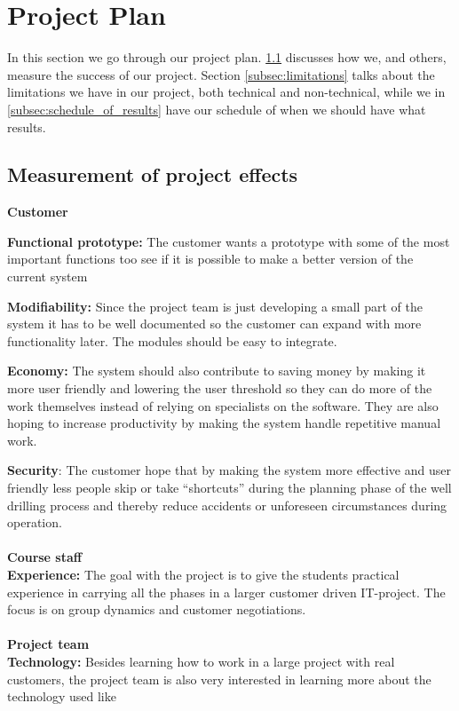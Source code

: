 \documentclass{report}
\begin{document}
\section{Project Plan} \label{sec:project_plan}
In this section we  go through our project plan. \ref{subsec:measurement_of_project_effects} discusses how we, and others, measure the success of our project. Section \ref{subsec:limitations} talks about the limitations we have in our project, both technical and non-technical, while we in \ref{subsec:schedule_of_results} have our schedule of when we should have what results.
\subsection{Measurement of project effects} \label{subsec:measurement_of_project_effects}
\textbf{Customer}

\textbf{Functional prototype:} The customer wants a prototype with some of the most important functions too see if it is possible to make a better version of the current system

\textbf{Modifiability:} Since the project team is just developing a small part of the system it has to be well documented so the customer can expand with more functionality later. The modules should be easy to integrate.

\textbf{Economy:} The system should also contribute to saving money by making it more user friendly and lowering the user threshold so they can do more of the work themselves instead of relying on specialists on the software. They are also hoping to increase productivity by making the system handle repetitive manual work. 

\textbf{Security}: The customer hope that by making the system more effective and user friendly less people skip or take “shortcuts” during the planning phase of the well drilling process and thereby reduce accidents or unforeseen circumstances during operation.\\ \\
\textbf{Course staff}\\
\textbf{Experience:} The goal with the project is to give the students practical experience in carrying all the phases in a larger customer driven IT-project. The focus is on group dynamics and customer negotiations.\\ \\
\textbf{Project team}\\
\textbf{Technology:} Besides learning how to work in a large project with real customers, the project team is also very interested in learning more about the technology used like 
 
\end{document}
